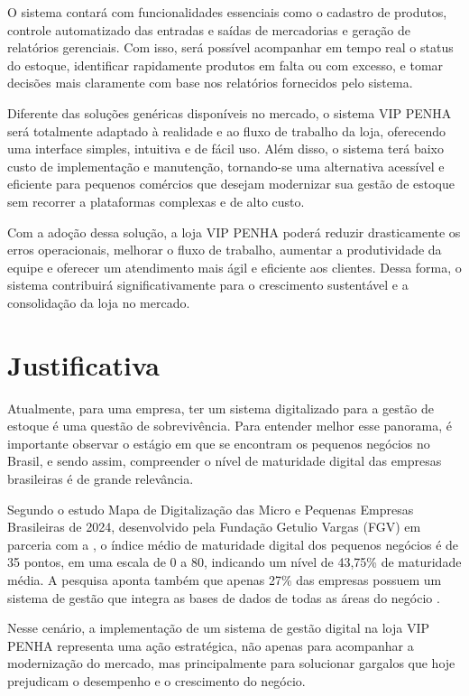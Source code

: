 \documentclass[
	12pt,				%
	openany,			%
	twoside,			%
	a4paper,			%
	english,			%
	brazil				%
	]{abntex2}
\begin{document}
O sistema contará com funcionalidades essenciais como o cadastro de produtos, controle automatizado das entradas e saídas de mercadorias e geração de relatórios gerenciais. Com isso, será possível acompanhar em tempo real o status do estoque, identificar rapidamente produtos em falta ou com excesso, e tomar decisões mais claramente com base nos relatórios fornecidos pelo sistema.

Diferente das soluções genéricas disponíveis no mercado, o sistema VIP PENHA será totalmente adaptado à realidade e ao fluxo de trabalho da loja, oferecendo uma interface simples, intuitiva e de fácil uso. Além disso, o sistema terá baixo custo de implementação e manutenção, tornando-se uma alternativa acessível e eficiente para pequenos comércios que desejam modernizar sua gestão de estoque sem recorrer a plataformas complexas e de alto custo.

Com a adoção dessa solução, a loja VIP PENHA poderá reduzir drasticamente os erros operacionais, melhorar o fluxo de trabalho, aumentar a produtividade da equipe e oferecer um atendimento mais ágil e eficiente aos clientes. Dessa forma, o sistema contribuirá significativamente para o crescimento sustentável e a consolidação da loja no mercado.
 

\section{Justificativa}
Atualmente, para uma empresa, ter um sistema digitalizado para a gestão de estoque é uma questão de sobrevivência. Para entender melhor esse panorama, é importante observar o estágio em que se encontram os pequenos negócios no Brasil, e sendo assim, compreender o nível de maturidade digital das empresas brasileiras é de grande relevância. 

Segundo o estudo Mapa de Digitalização das Micro e Pequenas Empresas Brasileiras de 2024, desenvolvido pela Fundação Getulio Vargas (FGV) em parceria com a  , o índice médio de maturidade digital dos pequenos negócios é de 35 pontos, em uma escala de 0 a 80, indicando um nível de 43,75\% de maturidade média. A pesquisa aponta também que apenas 27\% das empresas possuem um sistema de gestão que integra as bases de dados de todas as áreas do negócio . 

Nesse cenário, a implementação de um sistema de gestão digital na loja VIP PENHA representa uma ação estratégica, não apenas para acompanhar a modernização do mercado, mas principalmente para solucionar gargalos que hoje prejudicam o desempenho e o crescimento do negócio.
\end{document}
